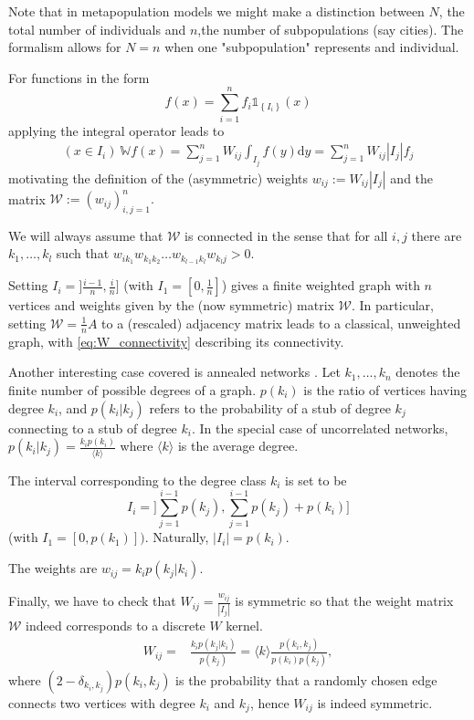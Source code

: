 \documentclass{article}
\renewcommand{\d}{\mathrm{d}}
\newcommand{\W}{\mathbb{W}}
\newcommand{\1}[1]{{\mathds{1}}_{\left\{#1\right\}}}
\newcommand{\rem}[1]{{#1}}
\begin{document}
\rem{Note that in metapopulation models we might make a distinction between $N$, the total number of individuals and $n$,the number of subpopulations (say cities). The formalism allows for $N=n$ when one "subpopulation" represents and individual. }

For functions in the form
$$f(x)=\sum_{i=1}^{n} f_i \1{I_i}(x)$$ 
applying the integral operator leads to
\begin{align*}
(x \in I_i) \ \W f(x)=\sum_{j=1}^n W_{ij} \int_{I_j} f(y) \d y=\sum_{j=1}^n W_{ij}|I_j| f_j
\end{align*}
motivating the definition of the (asymmetric) weights $w_{ij}:=W_{ij} |I_j|$ and the matrix $\mathcal{W}:=(w_{ij})_{i,j=1}^{n}.$

We will always assume that $\mathcal{W}$ is connected in the sense that for all $i,j$ there are $k_1,\dots, k_l$ such that $w_{ik_1}w_{k_1k_2} \dots w_{k_{l-1}k_l}w_{k_lj}>0.$  

Setting $I_{i}=]\frac{i-1}{n},\frac{i}{n} ]$ (with $I_1=[0,\frac{1}{n}]$) gives a finite weighted graph with $n$ vertices and weights given by the (now symmetric) matrix $\mathcal{W}.$ In particular, setting $\mathcal{W}=\frac{1}{n}A$ to a (rescaled) adjacency matrix leads to a classical, unweighted graph, with \eqref{eq:W_connectivity} describing its connectivity.

Another interesting case covered is annealed networks \cite{annealed}. Let $k_1,\dots, k_n$ denotes the finite number of possible degrees of a graph. $p(k_i)$ is the ratio of vertices having degree $k_i$, and $p(k_i|k_j)$ refers to the probability of a stub of degree $k_j$ connecting to a stub of degree $k_i$. In the special case of uncorrelated networks, $p(k_i|k_j)=\frac{k_i p(k_i)}{\langle k \rangle}$ where $\langle k \rangle$ is the average degree.

The interval corresponding to the degree class $k_i$ is set to be 
$$I_i=]\sum_{j=1}^{i-1}p(k_{j}),\sum_{j=1}^{i-1}p(k_{j})+p(k_i)]$$
(with $I_1=[0,p(k_1)]).$ Naturally, $|I_i|=p(k_i).$

The weights are $w_{ij}=k_i p(k_j|k_i)$.

Finally, we have to check that $W_{ij}=\frac{w_{ij}}{|I_j|}$ is symmetric so that the weight matrix $\mathcal{W}$ indeed corresponds to a discrete $W$ kernel.
\begin{align*}
W_{ij}=&\frac{k_i p(k_j|k_i)}{p(k_j)}=\langle k \rangle \frac{p(k_i,k_j)}{p(k_i)p(k_j)},
\end{align*}
where $(2-\delta_{k_i,k_j})p(k_i,k_j)$ is the probability that a randomly chosen edge connects two vertices with degree $k_i$ and $k_j$, hence $W_{ij}$ is indeed symmetric. 
\end{document}
